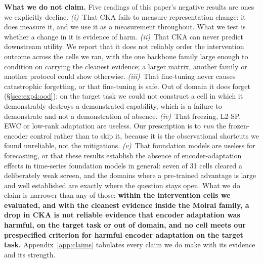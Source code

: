 %
\textbf{What we do not claim.}  Five readings of this paper's negative results are
ones we explicitly decline.  \emph{(i)}~That CKA fails to measure representation
change: it does measure it, and we use it as a measurement throughout.  What we
test is whether a change in it is evidence of harm.
\emph{(ii)}~That CKA can never predict downstream utility.  We report that it does
not reliably order the intervention outcome across the cells we ran, with the one
backbone family large enough to condition on carrying the cleanest evidence; a
larger matrix, another family or another protocol could show otherwise.
\emph{(iii)}~That fine-tuning never causes catastrophic forgetting, or that
fine-tuning is safe.  Out of domain it does forget (\S\ref{sec:exp4:ood}); on the
target task we could not construct a cell in which it demonstrably destroys a
demonstrated capability, which is a failure to demonstrate and not a
demonstration of absence.  \emph{(iv)}~That freezing, L2-SP, EWC or
low-rank adaptation are useless.  Our prescription is to \emph{run} the
frozen-encoder control rather than to skip it, because it is the observational
shortcuts we found unreliable, not the mitigations.  \emph{(v)}~That foundation
models are useless for forecasting, or that these results establish the absence of
encoder-adaptation effects in time-series foundation models in general: seven of 31
cells cleared a deliberately weak screen, and the domains where a pre-trained
advantage is large and well established are exactly where the question stays open.
What we do claim is narrower than any of those: \textbf{within the intervention
cells we evaluated, and with the cleanest evidence inside the Moirai family, a
drop in CKA is not reliable evidence that encoder adaptation was harmful, on the
target task or out of domain, and no cell meets our prespecified criterion for
harmful encoder adaptation on the target task.}
Appendix~\ref{app:claims} tabulates every claim we do make with its evidence and its
strength.


